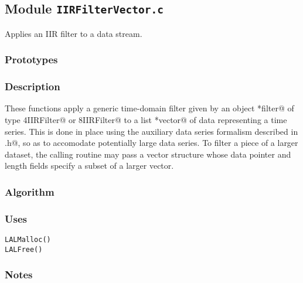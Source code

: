 
\subsection{Module \texttt{IIRFilterVector.c}}

Applies an IIR filter to a data stream.

\subsubsection{Prototypes}
\vspace{0.1in}


\subsubsection{Description}

These functions apply a generic time-domain filter given by an object
\verb@*filter@ of type \verb@REAL4IIRFilter@ or \verb@REAL8IIRFilter@
to a list \verb@*vector@ of data representing a time series.  This is
done in place using the auxiliary data series formalism described in
\verb@IIRFilter.h@, so as to accomodate potentially large data series.
To filter a piece of a larger dataset, the calling routine may pass a
vector structure whose data pointer and length fields specify a subset
of a larger vector.

\subsubsection{Algorithm}

\subsubsection{Uses}
\begin{verbatim}
LALMalloc()
LALFree()
\end{verbatim}

\subsubsection{Notes}

